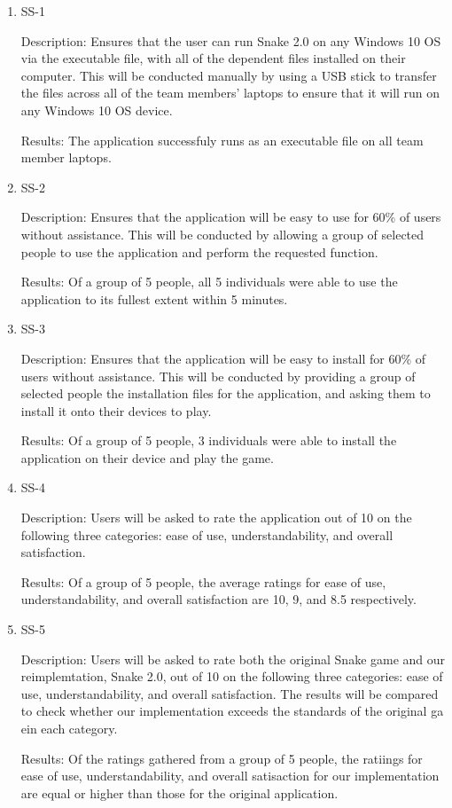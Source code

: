 \documentclass[12pt, titlepage]{article}
\begin{document}
\begin{enumerate}

\item{SS-1\\}
\label{nfr:ss-1}

Description: Ensures that the user can run Snake 2.0 on any Windows 10 OS via the executable file, with all of the dependent files installed on their computer. This will be conducted manually by using a USB stick to transfer the files across all of the team members' laptops to ensure that it will run on any Windows 10 OS device.

Results: The application successfuly runs as an executable file on all team member laptops.
					
\item{SS-2\\}
\label{nfr:ss-2}

Description: Ensures that the application will be easy to use for 60\% of users without assistance. This will be conducted by allowing a group of selected people to use the application and perform the requested function.

Results: Of a group of 5 people, all 5 individuals were able to use the application to its fullest extent within 5 minutes.

\item{SS-3\\}
\label{nfr:ss-3}

Description: Ensures that the application will be easy to install for 60\% of users without assistance. This will be conducted by providing a group of selected people the installation files for the application, and asking them to install it onto their devices to play.

Results: Of a group of 5 people, 3 individuals were able to install the application on their device and play the game.
			
\item{SS-4\\}
\label{nfr:ss-4}

Description: Users will be asked to rate the application out of 10 on the following three categories: ease of use, understandability, and overall satisfaction. 

Results: Of a group of 5 people, the average ratings for ease of use, understandability, and overall satisfaction are 10, 9, and 8.5 respectively.
					
\item{SS-5}
\label{nfr:ss-5}

Description: Users will be asked to rate both the original Snake game and our reimplemtation, Snake 2.0, out of 10 on the following three categories: ease of use, understandability, and overall satisfaction. The results will be compared to check whether our implementation exceeds the standards of the original ga ein each category.

Results: Of the ratings gathered from a group of 5 people, the ratiings for ease of use, understandability, and overall satisaction for our implementation are equal or higher than those for the original application.

\end{enumerate}
		
\end{document}

